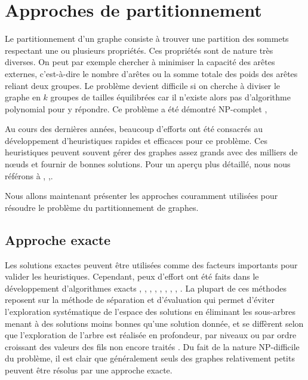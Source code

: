 
\section{Approches de partitionnement}
 Le partitionnement d'un graphe consiste à trouver une partition des sommets respectant une ou plusieurs propriétés. Ces propriétés sont de nature très diverses. On peut par exemple chercher à minimiser la capacité des arêtes externes, c'est-à-dire le nombre d'arêtes ou la somme totale des poids des arêtes reliant deux groupes.  Le problème devient difficile si on cherche à diviser le graphe en $k$ groupes de tailles équilibrées car il n'existe alors pas d'algorithme polynomial pour y répondre. Ce problème a été démontré NP-complet \citep{HYAFIL1973}, \citep{GAREY1976}

Au cours des dernières années, beaucoup d'efforts ont été consacrés au développement d'heuristiques rapides et efficaces pour ce problème. Ces heuristiques peuvent souvent gérer des graphes assez grands avec des milliers de nœuds et fournir de bonnes solutions. Pour un aperçu plus détaillé, nous nous référons à \citep{BichotSiarry2013}, \citep{BULU2016},\citep{SCHLOEGEL2000}.

Nous allons maintenant présenter les approches couramment utilisées pour résoudre le problème du partitionnement de graphes.


\subsection*{Approche exacte}
Les solutions exactes peuvent être utilisées comme des facteurs importants pour valider les heuristiques. Cependant, peux d'effort ont été faits dans le développement d'algorithmes exacts \citep{Armbruster2008}, \citep{Bonami2012}, \citep{Delling2012}, \citep{FeldmannWidmayer2015}, \citep{Ferreira1998}, \citep{Hager2013}, \citep{Kaibel2011}, \citep{Sellmann2003}, \citep{Sorensen2007}. La plupart de ces méthodes reposent sur la méthode de séparation et d'évaluation qui permet d'éviter l'exploration systématique de l'espace des solutions en éliminant les sous-arbres menant à des solutions moins bonnes qu'une solution donnée, et se diffèrent selon que l'exploration de l'arbre est réalisée en profondeur, par niveaux ou par ordre croissant des valeurs des fils non encore traités \citep{Land2010}.
Du fait de la nature NP-difficile du problème, il est clair que généralement seuls des graphes relativement petits peuvent être résolus par une approche exacte.

